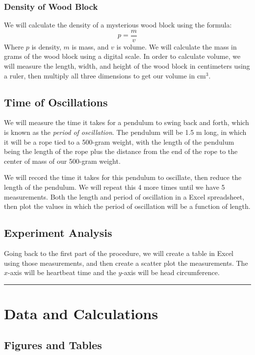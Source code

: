 \documentclass{article}
\begin{document}
\subsubsection{Density of Wood Block}
We will calculate the density of a mysterious wood block using the formula:
\[ p = \frac{m}{v}\]
Where $p$ is density, $m$ is mass, and $v$ is volume. 
We will calculate the mass in grams of the wood block using a digital scale. 
In order to calculate volume, we will measure the length, width, and height of 
the wood block in centimeters using a ruler, then multiply all three dimensions to 
get our volume in $\mathrm{cm}^3$.

\subsection{Time of Oscillations}
We will measure the time it takes for a pendulum to swing back and forth, which is known 
as the \emph{period of oscillation}. The pendulum will be 1.5 m long, in which it will be a rope tied 
to a 500-gram weight, with the length of the pendulum being the length of the rope plus the 
distance from the end of the rope to the center of mass of our 500-gram weight.

We will record the time it takes for this pendulum to oscillate, then reduce the length of 
the pendulum. We will repeat this 4 more times until we have 5 measurements. Both the length 
and period of oscillation in a Excel spreadsheet, then plot the values in which the period of 
oscillation will be a function of length.  

\subsection{Experiment Analysis}
Going back to the first part of the procedure, we will create a table in Excel using 
those measurements, and then create a scatter plot the measurements. The $x$-axis will 
be heartbeat time and the $y$-axis will be head circumference. 

\vspace{1em}
\hrule
\section{Data and Calculations}

\subsection{Figures and Tables}
\end{document}
